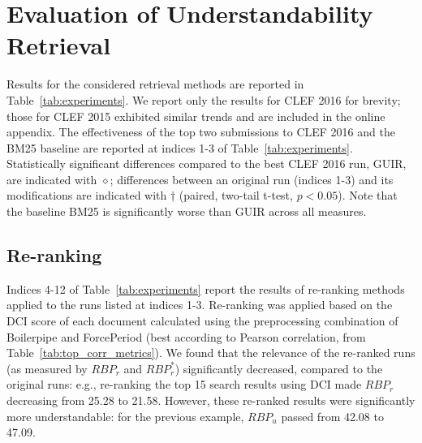\section{Evaluation of Understandability Retrieval}
\label{sec:results}




Results for the considered retrieval methods are reported in Table~\ref{tab:experiments}. We report only the results for CLEF 2016 for brevity; those for CLEF 2015 exhibited similar trends and are included in the online appendix. The effectiveness of the top two submissions to CLEF 2016 and the BM25 baseline are reported at indices 1-3 of Table~\ref{tab:experiments}. Statistically significant differences compared to the best CLEF 2016 run, GUIR, are indicated with $\diamond$; differences between an original run (indices 1-3) and its modifications are indicated with $\dagger$ (paired, two-tail t-test, $p<0.05$). Note that the baseline BM25 is significantly worse than GUIR across all measures. 


\vspace{-6pt}
\subsection{Re-ranking}
\label{results:reranking}

Indices 4-12 of Table~\ref{tab:experiments} report the results of re-ranking methods applied to the runs listed at indices 1-3. Re-ranking was applied based on the DCI score of each document calculated using the preprocessing combination of Boilerpipe and ForcePeriod (best according to Pearson correlation, from Table~\ref{tab:top_corr_metrics}).
We found that the relevance of the re-ranked runs (as measured by $RBP_r$ and $RBP_r^*$) significantly decreased, compared to the original runs: e.g., re-ranking the top 15 search results using DCI  made $RBP_r$ decreasing from 25.28 to 21.58. However, these re-ranked results were significantly more understandable: for the previous example, $RBP_u$ passed from 42.08 to 47.09.

